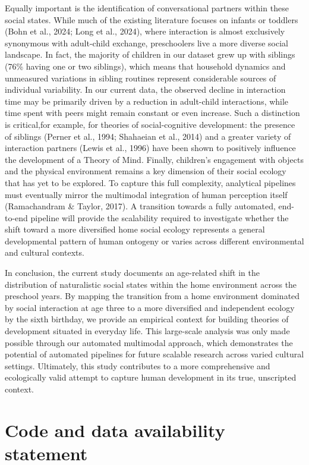 \documentclass[
  english,
  12pt,
  man,floatsintext]{apa6}
\begin{document}
Equally important is the identification of conversational partners within these social states. While much of the existing literature focuses on infants or toddlers (Bohn et al., 2024; Long et al., 2024), where interaction is almost exclusively synonymous with adult-child exchange, preschoolers live a more diverse social landscape. In fact, the majority of children in our dataset grew up with siblings (76\% having one or two siblings), which means that household dynamics and unmeasured variations in sibling routines represent considerable sources of individual variability. In our current data, the observed decline in interaction time may be primarily driven by a reduction in adult-child interactions, while time spent with peers might remain constant or even increase. Such a distinction is critical,for example, for theories of social-cognitive development: the presence of siblings (Perner et al., 1994; Shahaeian et al., 2014) and a greater variety of interaction partners (Lewis et al., 1996) have been shown to positively influence the development of a Theory of Mind. Finally, children's engagement with objects and the physical environment remains a key dimension of their social ecology that has yet to be explored. To capture this full complexity, analytical pipelines must eventually mirror the multimodal integration of human perception itself (Ramachandram \& Taylor, 2017). A transition towards a fully automated, end-to-end pipeline will provide the scalability required to investigate whether the shift toward a more diversified home social ecology represents a general developmental pattern of human ontogeny or varies across different environmental and cultural contexts.

In conclusion, the current study documents an age-related shift in the distribution of naturalistic social states within the home environment across the preschool years. By mapping the transition from a home environment dominated by social interaction at age three to a more diversified and independent ecology by the sixth birthday, we provide an empirical context for building theories of development situated in everyday life. This large-scale analysis was only made possible through our automated multimodal approach, which demonstrates the potential of automated pipelines for future scalable research across varied cultural settings. Ultimately, this study contributes to a more comprehensive and ecologically valid attempt to capture human development in its true, unscripted context.

\section{Code and data availability statement}\label{code-and-data-availability-statement}
\end{document}
